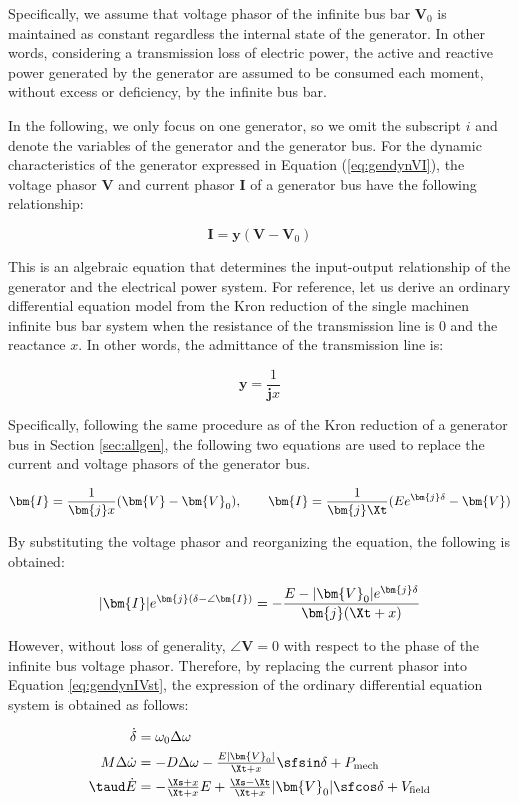 \documentclass[graybox, envcountchap]{svmult}
\begin{document}
Specifically, we assume that voltage phasor of the infinite bus bar $\bm{V}_0$
is maintained as constant regardless the internal state of the generator.  In
other words, considering a transmission loss of electric power, the active and
reactive power generated by the generator are assumed to be consumed each
moment, without excess or deficiency, by the infinite bus bar.

In the following, we only focus on one generator, so we omit the subscript $i$
and denote the variables of the generator and the generator bus. For the dynamic
characteristics of the generator expressed in Equation (\ref{eq:gendynVI}), the
voltage phasor $\bm{V}$ and current phasor $\bm{I}$ of a generator bus have the
following relationship:

\[
  \bm{I}= \bm{y} (\bm{V}-\bm{V}_0)
\]

This is an algebraic equation that determines the input-output relationship of
the generator and the electrical power system. For reference, let us derive an
ordinary differential equation model from the Kron reduction of the single
machinen infinite bus bar system when the resistance of the transmission line is
0 and the reactance $x$. In other words, the admittance of the transmission line
is:

\[
  \bm{y} = \frac{1}{\bm{j} x}
\]

Specifically, following the same procedure as of the Kron reduction of a
generator bus in Section \ref{sec:allgen}, the following two equations are used
to replace the current and voltage phasors of the generator bus.

\[
  \bm{I}= \frac{1}{\bm{j} x} (\bm{V}-\bm{V}_0)
  ,\qquad
  \bm{I}= \frac{1}{\bm{j} \Xt} (Ee^{\bm{j}\delta} -\bm{V})
\]

By substituting the voltage phasor and reorganizing the equation, the following
is obtained:

\[
  |\bm{I}| e^{\bm{j}(\delta -\angle \bm{I})}
  =
  -\frac{
  E- |\bm{V}_0|e^{\bm{j}\delta}
  }{
  \bm{j}(\Xt + x )
  }
\]

However, without loss of generality, $\angle \bm{V} = 0$ with respect to the
phase of the infinite bus voltage phasor. Therefore, by replacing the current
phasor into Equation \ref{eq:gendynIVst}, the expression of the ordinary
differential equation system is obtained as follows:

\begin{equation*}%
  \begin{aligned}
    \dot{\delta} &= \omega_0  \Delta \omega\\
    M   \Delta \dot{\omega}&= \textstyle
    - D \Delta\omega  - 
    \tfrac{
    E|\bm{V}_0|
    }{
    \Xt + x
    }
    \sfsin\delta
    +P_{{\rm mech}}
    \\
    \taud \dot{E} & = \textstyle
    - 
    \tfrac{
    \Xs + x
    }{
    \Xt + x
    }
    E
    +
    \tfrac{
    \Xs - \Xt
    }{
    \Xt + x
    }
    |\bm{V}_0| \sfcos\delta
    + V_{{\rm field}}
  \end{aligned}
\end{equation*}
\end{document}
